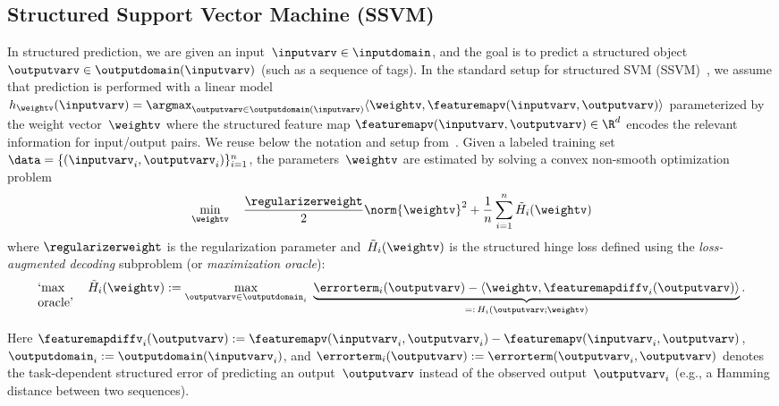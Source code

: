 \documentclass{article}
\begin{document}
\subsection{Structured Support Vector Machine (SSVM) \label{sec:ssvm}}
In structured prediction, we are given an input~$\inputvarv\in\inputdomain$, and the goal is to predict a structured object~$\outputvarv\in\outputdomain(\inputvarv)$ (such as a sequence of tags). In the standard setup for structured SVM (SSVM)~\citep{Taskar2003,Tsochantaridis2005}, we assume that prediction is performed with a linear model $h_{\weightv}(\inputvarv) = \argmax_{\outputvarv\in\outputdomain(\inputvarv)}\langle\weightv, \featuremapv(\inputvarv,\outputvarv) \rangle$ parameterized by the weight vector~$\weightv$ where the structured feature map $\featuremapv(\inputvarv,\outputvarv) \in \R^d$ encodes the relevant information for input/output pairs. We reuse below the notation and setup from~\citet{lacosteJulien13bcfw}. Given a labeled training set~$\data = \{(\inputvarv_i,\outputvarv_i)\}_{i=1}^n$, the parameters~$\weightv$ are estimated by solving a convex non-smooth optimization problem\vspace{-1.5mm}
\begin{equation}
    \label{eq:svmstruct_nslack_primal_nonsmooth}
    \min_{\weightv} \quad \frac{\regularizerweight}{2}\norm{\weightv}^2 +
    \frac1n \sum_{i=1}^n \tilde{H}_i(\weightv)\vspace{-1.5mm}
\end{equation}
where $\regularizerweight$ is the regularization parameter and~$\tilde{H}_i(\weightv)$ is the structured hinge loss defined using the \emph{loss-augmented decoding} subproblem (or \emph{maximization oracle}):
%
%
\begin{equation}\label{eq:subproblem_loss_augm}
\text{\parbox[t]{3em}{`max \\oracle'}} \quad 
  \tilde{H}_i(\weightv) := \max_{\outputvarv\in\outputdomain_i} \
    \underbrace{%
    \errorterm_i(\outputvarv)
    - \langle \weightv,
    \featuremapdiffv_i(\outputvarv)
    \rangle
    }_{=:\, H_i(\outputvarv;\weightv)}.
\end{equation}
%
%

Here $\featuremapdiffv_i(\outputvarv):= \featuremapv(\inputvarv_i,\outputvarv_i) - \featuremapv(\inputvarv_i,\outputvarv)$, $\outputdomain_i := \outputdomain(\inputvarv_i)$, and $\errorterm_i(\outputvarv) := \errorterm(\outputvarv_i,\outputvarv)$ denotes the task-dependent structured error of predicting an output~$\outputvarv$ instead of the observed output~$\outputvarv_i$ (e.g., a Hamming distance between two sequences).
\end{document}
